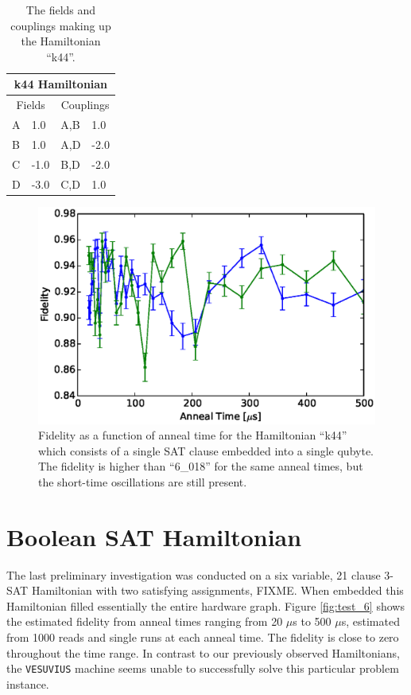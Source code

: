 \begin{table}
	\begin{center}
\begin{tabular}{ | l | l | l | l |}
	\hline
	\multicolumn{4}{|c|}{k44 Hamiltonian} \\ \hline
	\multicolumn{2}{|c|}{Fields} & \multicolumn{2}{c|}{Couplings} \\ \hline
	A & 1.0 & A,B & 1.0 \\
	B & 1.0 & A,D & -2.0 \\
	C & -1.0 & B,D & -2.0 \\
	D & -3.0 & C,D & 1.0 \\ \hline
\end{tabular}
\end{center}
\caption[k44 Hamiltonian]{The fields and couplings making up the Hamiltonian ``k44''.}
\end{table}

\begin{figure}
	\includegraphics{img/k44.eps}
	\caption[Single K44 Fidelity]{Fidelity as a function of anneal time for the Hamiltonian ``k44'' which consists of a single SAT clause embedded into a single qubyte.  The fidelity is higher than ``6\_018'' for the same anneal times, but the short-time oscillations are still present.}
	\label{fig:k44_comparison}
\end{figure}

\section{Boolean SAT Hamiltonian}
The last preliminary investigation was conducted on a six variable, 21 clause 3-SAT Hamiltonian with two satisfying assignments, FIXME.  When embedded this Hamiltonian filled essentially the entire hardware graph.  Figure \ref{fig:test_6} shows the estimated fidelity from anneal times ranging from 20 $\mu$s to 500 $\mu$s, estimated from 1000 reads and single runs at each anneal time.  The fidelity is close to zero throughout the time range.  In contrast to our previously observed Hamiltonians, the \texttt{VESUVIUS} machine seems unable to successfully solve this particular problem instance.  

